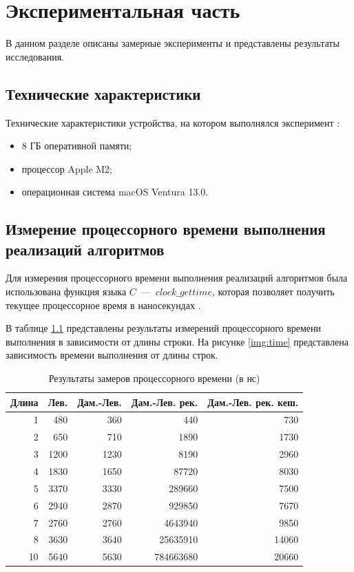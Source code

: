 \chapter{Экспериментальная часть}

В данном разделе описаны замерные эксперименты и представлены результаты исследования.

\section{Технические характеристики}
Технические характеристики устройства, на котором выполнялся эксперимент \cite{bib:5}:
\begin{itemize}
	\item 8 ГБ оперативной памяти;
	\item процессор Apple M2;
    \item операционная система macOS Ventura 13.0.
\end{itemize}

\section{Измерение процессорного времени выполнения реализаций алгоритмов}

Для измерения процессорного времени выполнения реализаций алгоритмов была использована функция языка $C$~---~$clock\_gettime$, которая позволяет получить текущее процессорное время в наносекундах \cite{bib:6}.

В таблице \ref{table:time} представлены результаты измерений процессорного времени выполнения в зависимости от длины строки. На рисунке \ref{img:time} представлена зависимость времени выполнения от длины строк.

\begin{table}[h]
  \caption{\label{table:time} Результаты замеров процессорного времени (в нс)}
  \begin{center}
    \begin{tabular}{|r|r|r|r|r|}
      \hline
      Длина & Лев. & Дам.-Лев. & Дам.-Лев. рек. & Дам.-Лев. рек. кеш. \\ \hline
      1 & 480 & 360 & 440 & 730 \\ \hline
      2 & 650 & 710 & 1890 & 1730 \\ \hline
      3 & 1200 & 1230 & 8190 & 2960 \\ \hline
      4 & 1830 & 1650 & 87720 & 8030 \\ \hline
      5 & 3370 & 3330 & 289660 & 7500 \\ \hline
      6 & 2940 & 2870 & 929850 & 7670 \\ \hline
      7 & 2760 & 2760 & 4643940 & 9850 \\ \hline
      8 & 3630 & 3640 & 25635910 & 14060 \\ \hline
      10 & 5640 & 5630 & 784663680 & 20660 \\ \hline
    \end{tabular}
  \end{center}
\end{table}

